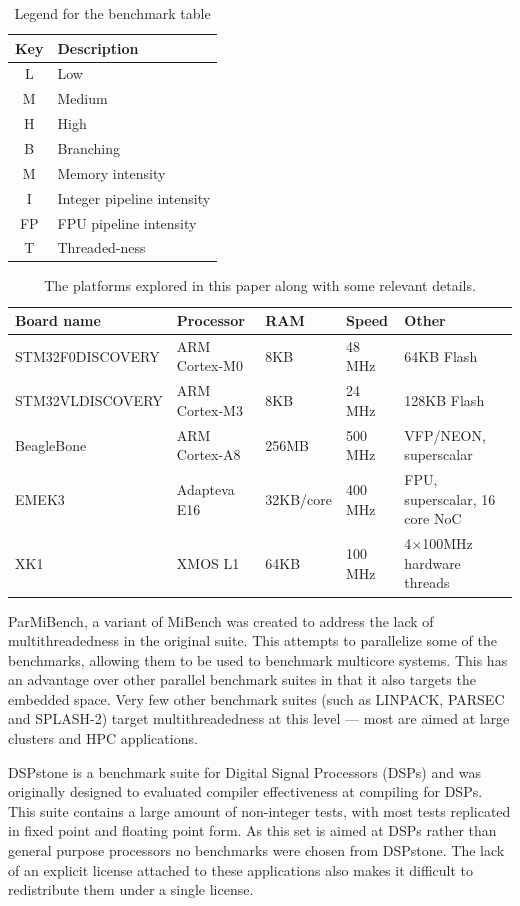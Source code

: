 \documentclass[twocolumn]{article}
\begin{document}
\begin{table}[t]
\centering
	\begin{tabular}{c l}
		Key & Description \\
		\hline
		L	&	Low \\
		M	&	Medium \\
		H	&	High \\
		\hline
		B	&	Branching \\
		M	&	Memory intensity \\
		I	&	Integer pipeline intensity \\
		FP	&	FPU pipeline intensity \\
		T	&	Threaded-ness \\
	\end{tabular}
	\caption{Legend for the benchmark table}
	\label{BenchmarkLegend}
\end{table}


\begin{table}[!hbt]
	\centering
	\begin{tabular}{l l l l l}
		\textbf{Board name} & \textbf{Processor} & \textbf{RAM} & \textbf{Speed} & \textbf{Other} \\
		\hline
		STM32F0DISCOVERY	& ARM Cortex-M0 		& 8KB		& 48 MHz		  & 64KB Flash\\
		STM32VLDISCOVERY	& ARM Cortex-M3 		& 8KB		& 24 MHz		  & 128KB Flash\\
		BeagleBone			& ARM Cortex-A8 		& 256MB		& 500 MHz		  & VFP/NEON, superscalar\\
		EMEK3				& Adapteva E16 			& 32KB/core & 400 MHz		  & FPU, superscalar, 16 core NoC\\
		XK1					& XMOS L1 				& 64KB		& 100 MHz 		& 4$\times$100MHz hardware threads \\
	\end{tabular}
	\caption{The platforms explored in this paper along with some relevant details.}
	\label{Table:Platforms}
\end{table}
ParMiBench, a variant of MiBench was created to address the lack of multithreadedness in the original suite. This attempts to parallelize some of the benchmarks, allowing them to be used to benchmark multicore systems. This has an advantage over other parallel benchmark suites in that it also targets the embedded space. Very few other benchmark suites (such as LINPACK, PARSEC and SPLASH-2\cite{Bienia2008}) target multithreadedness at this level --- most are aimed at large clusters and HPC applications.

DSPstone\cite{Zivojnovic} is a benchmark suite for Digital Signal Processors (DSPs) and was originally designed to evaluated compiler effectiveness at compiling for DSPs. This suite contains a large amount of non-integer tests, with most tests replicated in fixed point and floating point form. As this set is aimed at DSPs rather than general purpose processors no benchmarks were chosen from DSPstone. The lack of an explicit license attached to these applications also makes it difficult to redistribute them under a single license.
\end{document}
